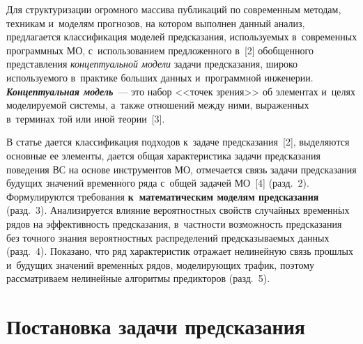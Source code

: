 \begin{multicols}{2}
  Для структуризации огромного массива пуб\-ли\-ка\-ций по современным 
методам, техникам и~моделям прогнозов, на котором выполнен данный 
анализ, предлагается классификация моделей \mbox{предсказания}, используемых 
в~современных про\-грам\-мных МО, с~использованием предложенного в~[2] 
обобщенного пред\-став\-ле\-ния \textit{концептуальной модели} задачи 
предсказания, широко ис\-поль\-зу\-емо\-го в~практике больших данных 
и~программной инженерии. {\bfseries\textit{Концептуальная модель}}~--- это набор <<точек зрения>> об элементах и~целях мо\-де\-ли\-ру\-емой 
сис\-те\-мы, а~так\-же отношений между ними, выраженных в~терминах той или 
иной тео\-рии~[3]. 
  
  В статье дается классификация подходов к~задаче предсказания~[2], 
выделяются основные ее элементы, дается общая характеристика задачи 
предсказания поведения ВС на основе 
инструментов МО, отмечается связь задачи пред\-ска\-за\-ния 
будущих значений временн$\acute{\mbox{о}}$го ряда с~общей задачей МО~[4] (разд.~2). 
Формулируются требования \textbf{к~математическим моделям 
предсказания} (разд.~3). Анализируется влияние вероятностных свойств 
случайных временн$\acute{\mbox{ы}}$х рядов на эффективность предсказания, в~частности 
возможность предсказания без точного знания вероятностных 
распределений предсказываемых данных (разд.~4). Показано, что ряд 
характеристик отражает нелинейную связь прошлых и~будущих значений 
временн$\acute{\mbox{ы}}$х рядов, моделирующих трафик, поэтому рассматриваем 
нелинейные алгоритмы предикторов (разд.~5). 

  
\section{Постановка задачи предсказания }



\end{multicols}
